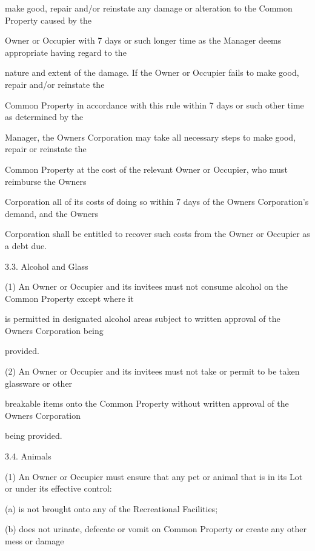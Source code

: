 \documentclass{article}
\begin{document}
{\fontsize{10.02}{1}make good, repair and/or reinstate any damage or alteration to the Common Property caused by the }

{\fontsize{10.02}{1}Owner or Occupier with 7 days or such longer time as the Manager deems appropriate having regard to the }

{\fontsize{10.02}{1}nature and extent of the damage. If the Owner or Occupier fails to make good, repair and/or reinstate the }

{\fontsize{10.02}{1}Common Property in accordance with this rule within 7 days or such other time as determined by the }

{\fontsize{10.02}{1}Manager, the Owners Corporation may take all necessary steps to make good, repair or reinstate the }

{\fontsize{10.02}{1}Common Property at the cost of the relevant Owner or Occupier, who must reimburse the Owners }

{\fontsize{10.02}{1}Corporation all of its costs of doing so within 7 days of the Owners Corporation’s demand, and the Owners }

{\fontsize{10.02}{1}Corporation shall be entitled to recover such costs from the Owner or Occupier as a debt due. }

{\fontsize{9.99}{1}3.3. Alcohol and Glass }

{\fontsize{9.962}{1}(1) An Owner or Occupier and its invitees must not consume alcohol on the Common Property except where it }

{\fontsize{10.02}{1}is permitted in designated alcohol areas subject to written approval of the Owners Corporation being }

{\fontsize{10.02}{1}provided. }

{\fontsize{9.962}{1}(2) An Owner or Occupier and its invitees must not take or permit to be taken glassware or other }

{\fontsize{10.02}{1}breakable items onto the Common Property without written approval of the Owners Corporation }

{\fontsize{10.02}{1}being provided. }

{\fontsize{9.99}{1}3.4. Animals }

{\fontsize{9.962}{1}(1) An Owner or Occupier must ensure that any pet or animal that is in its Lot or under its effective control: }

{\fontsize{9.962}{1}(a) is not brought onto any of the Recreational Facilities; }

{\fontsize{9.962}{1}(b) does not urinate, defecate or vomit on Common Property or create any other mess or damage }
\end{document}

